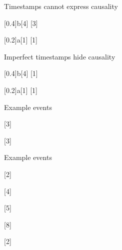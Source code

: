 \documentclass[tikz]{standalone}
\begin{document}
  \begin{msc}{Timestamps cannot express causality}
     
     [0.4]{b}[4]
     [3]
     \nextlevel[2]

     [0.2]{a}[1]
     [1]
     \nextlevel[1]
  \end{msc}
  
  \begin{msc}{Imperfect timestamps hide causality}
     
     [0.4]{b}[4]
     [1]
     \nextlevel[2]

     [0.2]{a}[1]
     [1]
     \nextlevel[1]
  \end{msc}


  
  \begin{msc}{Example events}
     
     \nextlevel

     [3]
     \nextlevel[2]

     \nextlevel[2]

     \nextlevel
     [3]

     \nextlevel[2]
     \nextlevel 
   \end{msc}
  
 \begin{msc}{Example events}
     
     \nextlevel 
     [2]
     \nextlevel[2] 
     
     \nextlevel[1] 
     [4]
     \nextlevel[1] 

     \nextlevel 
     [5]
     \nextlevel[2] 
     
     \nextlevel[3] 
     
     \nextlevel[2] 
     
     \nextlevel[1] 
     [8]
     \nextlevel[2] 
     
     \nextlevel[1] 
     [2]
     \nextlevel[2] 

     \nextlevel[3]

     \nextlevel[2]

   \end{msc}
  
\end{document}
